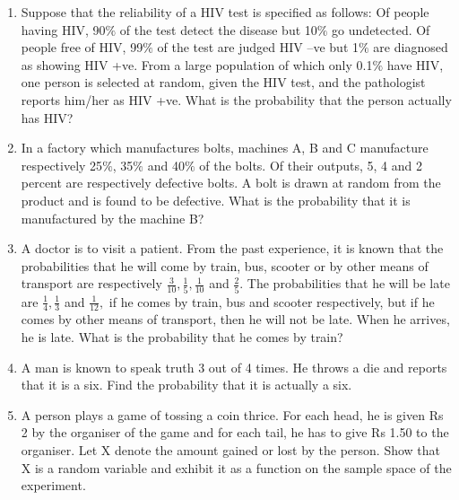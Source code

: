 \begin{enumerate}[label=\arabic*.,ref=\thesubsection.\theenumi]
\item Suppose that the reliability of a HIV test is specified as follows: Of people having HIV, 90$\%$ of the test detect the disease but 10$\%$ go undetected. Of people free of HIV, 99$\%$ of the test are judged HIV –ve but 1$\%$ are diagnosed as showing HIV +ve. From a large population of which only 0.1$\%$ have HIV, one person is selected at random, given the HIV test, and the pathologist reports him/her as HIV +ve. What is the probability that the person actually has HIV?\\
\solution


\item In a factory which manufactures bolts, machines A, B and C manufacture respectively 25$\%$, 35$\%$ and 40$\%$ of the bolts. Of their outputs, 5, 4 and 2 percent are respectively defective bolts. A bolt is drawn at random from the product and is found to be defective. What is the probability that it is manufactured by the machine B?\\
\solution


\item A doctor is to visit a patient. From the past experience, it is known that the probabilities that he will come by train, bus, scooter or by other means of transport are respectively $\frac{3}{10},\frac{1}{5},\frac{1}{10}$ and $\frac{2}{5}.$ The probabilities that he will be late are $\frac{1}{4},\frac{1}{3}$ and $\frac{1}{12},$ if he comes by train, bus and scooter respectively, but if he comes by other means of transport, then he will not be late. When he arrives, he is late. What is the probability that he comes by train?\\
\solution


\item A man is known to speak truth 3 out of 4 times. He throws a die and reports that it is a six. Find the probability that it is actually a six.\\

\item A person plays a game of tossing a coin thrice. For each head, he is given Rs 2 by the organiser of the game and for each tail, he has to give Rs 1.50 to the organiser. Let X denote the amount gained or lost by the person. Show that X is a random variable and exhibit it as a function on the sample space of the experiment.\\


\end{enumerate}
